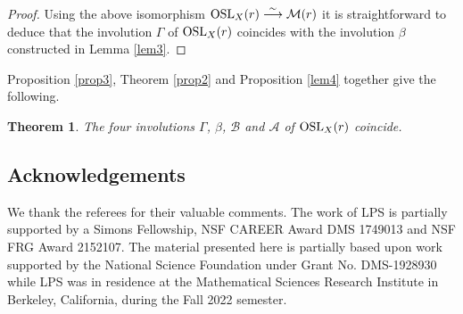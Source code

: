 \documentclass[pdftex]{sigma}
\numberwithin{equation}{section}
\newtheorem{Theorem}{Theorem}[section]
\begin{document}
\begin{proof}
Using the above isomorphism ${\rm OSL}_X(r) \stackrel{\sim}{\longrightarrow} {\mathcal M}(r)$
it is straightforward to deduce that the involution $\Gamma$ of ${\rm OSL}_X(r)$
coincides with the involution $\beta$ constructed in Lemma \ref{lem3}.
\end{proof}

Proposition \ref{prop3}, Theorem \ref{prop2} and Proposition \ref{lem4}
together give the following.

\begin{Theorem}\label{cor3}
The four involutions $\Gamma$, $\beta$, $\mathcal B$ and ${\mathcal A}$ of
${\rm OSL}_X(r)$ coincide.
\end{Theorem}

\subsection*{Acknowledgements}

We thank the referees for their valuable comments.
The work of LPS is partially supported by a Simons Fellowship, NSF CAREER Award DMS 1749013 and NSF FRG Award 2152107. The material
presented here is partially based upon work supported by the National Science Foundation under Grant No. DMS-1928930 while LPS was in
residence at the Mathematical Sciences Research Institute in Berkeley, California, during the Fall 2022 semester.
\end{document}
